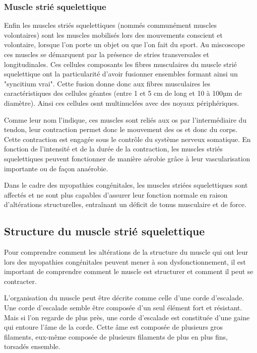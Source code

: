 \subsubsection{Muscle strié squelettique}
Enfin les muscles striés squelettiques (nommés communément muscles volontaires) sont les muscles mobilisés lors des mouvements conscient et volontaire, lorsque l'on porte un objet ou que l'on fait du sport. Au miscoscope ces muscles se démarquent par la présence de stries transversales et longitudinales. Ces cellules composants les fibres musculaires du muscle strié squelettique ont la particularité d'avoir fusionner ensembles formant ainsi un "syncitium vrai". Cette fusion donne donc aux fibres musculaires les caractéristiques des cellules géantes (entre 1 et 5 cm de long et 10 à 100µm de diamètre). Ainsi ces cellules osnt multinuclées avec des noyaux périphériques.

Comme leur nom l'indique, ces muscles sont reliés aux os par l'intermédiaire du tendon, leur contraction permet donc le mouvement des os et donc du corps. Cette contraction est engagée sous le contrôle du système nerveux somatique. En fonction de l'intensité et de la durée de la contraction, les muscles striés squelettiques peuvent fonctionner de manière aérobie grâce à leur vascularisation importante ou de façon anaérobie.

Dans le cadre des myopathies congénitales, les muscles striées squelettiques sont affectés et ne sont plus capables d'assurer leur fonction normale en raison d'altérations structurelles, entraînant un déficit de tonus musculaire et de force.

\subsection{Structure du muscle strié squelettique}
Pour comprendre comment les altérations de la structure du muscle qui ont leur lors des myopathies congénitales peuvent mener à son dysfonctionnement, il est important de comprendre comment le muscle est structurer et comment il peut se contracter.

L'organisation du muscle peut être décrite comme celle d'une corde d'escalade. Une corde d'escalade semble être composée d'un seul élément fort et résistant. Mais si l'on regarde de plus près, une corde d'escalade est constituée d'une gaine qui entoure l'âme de la corde. Cette âme est composée de plusieurs gros filaments, eux-même composée de plusieurs filaments de plus en plus fins, torsadés ensemble. 

